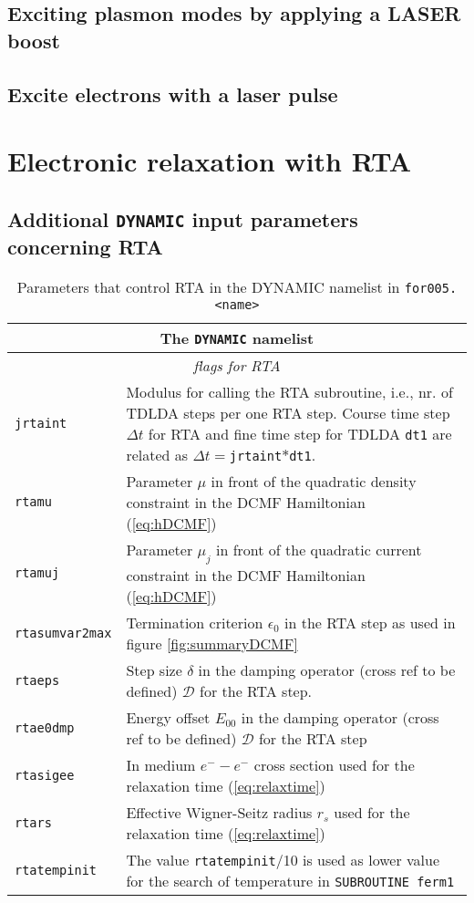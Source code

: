 \documentclass[11pt,a4paper]{article}
\begin{document}
		\subsection{Exciting plasmon modes by applying a LASER boost}
		\subsection{Excite electrons with a laser pulse}
	
	\section{Electronic relaxation with RTA}
		\subsection{Additional \texttt{DYNAMIC} input parameters concerning RTA}

			\begin{table}[t]
				\caption{Parameters that control RTA in the DYNAMIC namelist in \texttt{for005.<name>}}\label{tab:dyn-input-params-rta}
				\begin{tabular}{|p{3.5cm}|p{11.2cm}|}
					\hline
					\multicolumn{2}{|c|}{The \texttt{DYNAMIC} namelist}\\
					\hline
					\multicolumn{2}{|c|}{\textit{\color{activeColor}flags for RTA}} \\
					\hline			
					\texttt{jrtaint} &  Modulus for calling the RTA subroutine, i.e., nr. of TDLDA steps per one RTA step. Course time step $\Delta t$ for RTA and fine time step for TDLDA \texttt{dt1} are related as $\Delta t=$\texttt{jrtaint}$*$\texttt{dt1}.\\
					\hline
					\texttt{rtamu} & Parameter $\mu$ in front of the quadratic density constraint in the DCMF Hamiltonian (\ref{eq:hDCMF})\\
					\hline
					\texttt{rtamuj} & Parameter $\mu_j$ in front of the quadratic current constraint in the DCMF Hamiltonian (\ref{eq:hDCMF})\\
					\hline
					\texttt{rtasumvar2max} & Termination criterion $\epsilon_0$ in the RTA step as used in figure \ref{fig:summaryDCMF}\\
					\hline
					\texttt{rtaeps} & Step size $\delta$ in the damping operator (cross ref to be defined) $\mathcal{D}$ for the RTA step.\\
					\hline
					\texttt{rtae0dmp} & Energy offset $E_{00}$ in the damping operator (cross ref to be defined) $\mathcal{D}$ for the RTA step\\
					\hline
					\texttt{rtasigee} & In medium $e^--e^-$ cross section used for the relaxation time (\ref{eq:relaxtime})\\
					\hline
					\texttt{rtars} & Effective Wigner-Seitz radius $r_s$ used for the relaxation time (\ref{eq:relaxtime})\\
					\hline
					\texttt{rtatempinit} & The value \texttt{rtatempinit}/10 is used as lower value for the search of temperature in \texttt{SUBROUTINE ferm1}\\
					\hline
				\end{tabular}
			\end{table}
\end{document}
